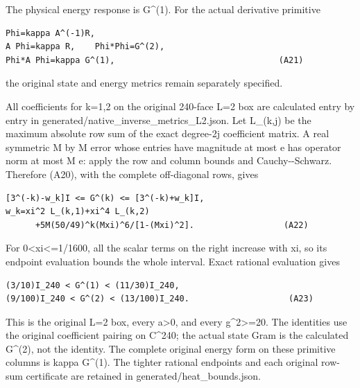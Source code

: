 \documentclass[11pt,a4paper]{article}
\renewcommand{\[}{\begingroup\small\originaldisplaystart}
\renewcommand{\]}{\originaldisplayend\endgroup}
\begin{document}
The physical energy response is G\^{}(1). For the actual derivative
primitive

\begin{verbatim}
Phi=kappa A^(-1)R,
A Phi=kappa R,    Phi*Phi=G^(2),
Phi*A Phi=kappa G^(1),                                 (A21)
\end{verbatim}

the original state and energy metrics remain separately specified.

All coefficients for k=1,2 on the original 240-face L=2 box are
calculated entry by entry in
{g\allowbreak{}e\allowbreak{}n\allowbreak{}e\allowbreak{}r\allowbreak{}a\allowbreak{}t\allowbreak{}e\allowbreak{}d\allowbreak{}/\allowbreak{}n\allowbreak{}a\allowbreak{}t\allowbreak{}i\allowbreak{}v\allowbreak{}e\allowbreak{}\_\allowbreak{}i\allowbreak{}n\allowbreak{}v\allowbreak{}e\allowbreak{}r\allowbreak{}s\allowbreak{}e\allowbreak{}\_\allowbreak{}m\allowbreak{}e\allowbreak{}t\allowbreak{}r\allowbreak{}i\allowbreak{}c\allowbreak{}s\allowbreak{}\_\allowbreak{}L\allowbreak{}2\allowbreak{}.\allowbreak{}j\allowbreak{}s\allowbreak{}o\allowbreak{}n\allowbreak{}.\allowbreak{}}
Let L\_(k,j) be the maximum absolute row sum of the exact degree-2j
coefficient matrix. A real symmetric M by M error whose entries have
magnitude at most e has operator norm at most M e: apply the row and
column bounds and Cauchy-\/-Schwarz. Therefore (A20), with the complete
off-diagonal rows, gives

\begin{verbatim}
[3^(-k)-w_k]I <= G^(k) <= [3^(-k)+w_k]I,
w_k=xi^2 L_(k,1)+xi^4 L_(k,2)
      +5M(50/49)^k(Mxi)^6/[1-(Mxi)^2].                  (A22)
\end{verbatim}

For 0\textless xi\textless=1/1600, all the scalar terms on the right
increase with xi, so its endpoint evaluation bounds the whole interval.
Exact rational evaluation gives

\begin{verbatim}
(3/10)I_240 < G^(1) < (11/30)I_240,
(9/100)I_240 < G^(2) < (13/100)I_240.                    (A23)
\end{verbatim}

This is the original L=2 box, every a\textgreater0, and every
g\^{}2\textgreater=20. The identities use the original coefficient
pairing on C\^{}240; the actual state Gram is the calculated G\^{}(2),
not the identity. The complete original energy form on these primitive
columns is kappa G\^{}(1). The tighter rational endpoints and each
original row-sum certificate are retained in
{g\allowbreak{}e\allowbreak{}n\allowbreak{}e\allowbreak{}r\allowbreak{}a\allowbreak{}t\allowbreak{}e\allowbreak{}d\allowbreak{}/\allowbreak{}h\allowbreak{}e\allowbreak{}a\allowbreak{}t\allowbreak{}\_\allowbreak{}b\allowbreak{}o\allowbreak{}u\allowbreak{}n\allowbreak{}d\allowbreak{}s\allowbreak{}.\allowbreak{}j\allowbreak{}s\allowbreak{}o\allowbreak{}n\allowbreak{}.\allowbreak{}}
\end{document}
